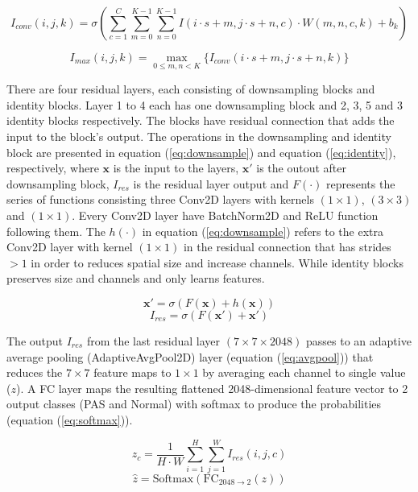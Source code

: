 \documentclass[12pt]{article}
\begin{document}
\begin{equation} \label{eq:2dconv}
I_{conv}{(i,j,k)} = \sigma \left(  \sum_{c=1}^{C} \sum_{m=0}^{K-1} \sum_{n=0}^{K-1} I{(i \cdot s + m,j \cdot s + n, c)} \cdot W{(m,n,c,k)} + b_k \right)
\end{equation}

\begin{equation} \label{eq:2dmax}
I_{max}{(i,j,k)} = \max_{0 \leq m,n < K} \{ I_{conv}{(i \cdot s + m, j \cdot s + n, k)} \}
\end{equation}

There are four residual layers, each consisting of downsampling blocks and identity blocks. Layer 1 to 4 each has one downsampling block and 2, 3, 5 and 3 identity blocks respectively. The blocks have residual connection that adds the input to the block’s output. The operations in the downsampling and identity block are presented in equation (\ref{eq:downsample}) and equation (\ref{eq:identity}), respectively, where $\mathbf{x}$ is the input to the layers, $\mathbf{x'}$ is the outout after downsampling block, $I_{res}$ is the residual layer output and  $F(\mathbf{\cdot})$ represents the series of functions consisting three Conv2D layers with kernels $(1\times1)$, $(3\times3)$ and $(1\times1)$. Every Conv2D layer have BatchNorm2D and ReLU function following them. The $h(\mathbf{\cdot})$ in equation (\ref{eq:downsample}) refers to the extra Conv2D layer with kernel $(1\times1)$ in the residual connection that has strides $>1$ in order to reduces spatial size and increase channels. While identity blocks preserves size and channels and only learns features. 

\begin{equation} \label{eq:downsample}
\mathbf{x'} = \sigma(F(\mathbf{x}) + h(\mathbf{x}))
\end{equation}
\begin{equation} \label{eq:identity}
I_{res} = \sigma(F(\mathbf{x'}) + \mathbf{x'})
\end{equation}

The output $I_{res}$ from the last residual layer $(7\times7\times2048)$ passes to an adaptive average pooling (AdaptiveAvgPool2D) layer (equation (\ref{eq:avgpool})) that reduces the $7\times7$ feature maps to $1\times1$ by averaging each channel to single value ($z$). A FC layer maps the resulting flattened 2048-dimensional feature vector to 2 output classes (PAS and Normal) with softmax to produce the probabilities (equation (\ref{eq:softmax})).

\begin{equation} \label{eq:avgpool} 
z_c = \frac{1}{H \cdot W} \sum_{i=1}^{H} \sum_{j=1}^{W}I_{res}{(i,j,c)}
\end{equation}
\begin{equation} \label{eq:softmax}
\hat{z} = \text{Softmax}(\text{FC}_{2048 \to 2}(z))
\end{equation}
\end{document}
